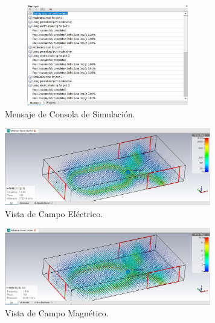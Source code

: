 \documentclass[a4paper]{IEEEtran} %
\begin{document}
\begin{figure}[h]    
    \centering
    \includegraphics[width=9cm,height=4.4cm]{imagenes/img13}
    \caption{Mensaje de Consola de Simulación.}
    \label{fig:modelamiento8}
\end{figure}
\vspace{10mm}
\begin{figure}[h]    
    \centering
    \includegraphics[width=9cm]{imagenes/img15}
    \caption{Vista de Campo Eléctrico.}
    \label{fig:modelamiento9}
\end{figure}
\begin{figure}[h]    
    \centering
    \includegraphics[width=9cm]{imagenes/img16}
    \caption{Vista de Campo Magnético.}
    \label{fig:modelamiento10}
\end{figure}



\end{document}
